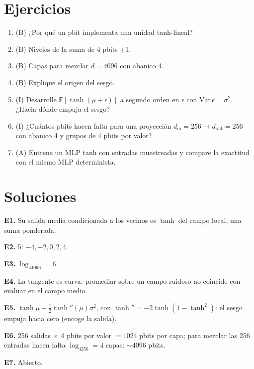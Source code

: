 \documentclass[11pt,a4paper]{article}
\begin{document}
\section{Ejercicios}
\begin{enumerate}[label=\textbf{E\arabic*.}]
\item (B) ¿Por qué un pbit implementa una unidad tanh-lineal?
\item (B) Niveles de la suma de 4 pbits $\pm1$.
\item (B) Capas para mezclar $d=4096$ con abanico 4.
\item (B) Explique el origen del sesgo.
\item (I) Desarrolle $\mathbb E[\tanh(\mu+\epsilon)]$ a segundo orden en $\epsilon$ con $\mathrm{Var}\,\epsilon=\sigma^2$. ¿Hacia dónde empuja el sesgo?
\item (I) ¿Cuántos pbits hacen falta para una proyección $d_{\text{in}}=256\to d_{\text{out}}=256$ con abanico 4 y grupos de 4 pbits por valor?
\item (A) Entrene un MLP tanh con entradas muestreadas y compare la exactitud con el mismo MLP determinista.
\end{enumerate}
\section{Soluciones}
\begin{solucion}
\textbf{E1.} Su salida media condicionada a los vecinos es $\tanh$ del campo local, una suma ponderada.

\textbf{E2.} 5: $-4,-2,0,2,4$.

\textbf{E3.} $\log_44096=6$.

\textbf{E4.} La tangente es curva: promediar sobre un campo ruidoso no coincide con evaluar en el campo medio.

\textbf{E5.} $\tanh\mu+\tfrac12\tanh''(\mu)\sigma^2$, con $\tanh''=-2\tanh(1-\tanh^2)$: el sesgo empuja hacia cero (encoge la salida).

\textbf{E6.} 256 salidas $\times$ 4 pbits por valor $=1024$ pbits por capa; para mezclar las 256 entradas hacen falta $\log_4256=4$ capas: $\sim4096$ pbits.

\textbf{E7.} Abierto.
\end{solucion}
\end{document}
